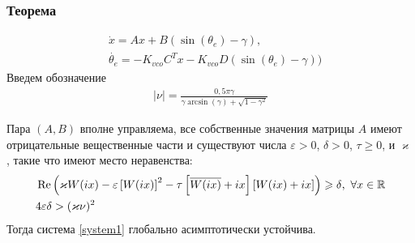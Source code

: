 \documentclass{beamer}
\begin{document}

\begin{frame}
\frametitle{Теорема}
\vspace{-4mm}
 \begin{equation}\label{system1}
 \begin{aligned}
 &\dot{x} = Ax + B(\operatorname{sin}(\theta_e) - \gamma) \text{,}\\
 &\dot{\theta_e} = -K_{vco}C^T x -K_{vco}D(\operatorname{sin}(\theta_e) - \gamma))
 \end{aligned}
\end{equation}
\vspace{-2.5mm}
Введем обозначение
 \begin{equation}
 \begin{aligned}
\mid\nu\mid = \frac{0,5\pi\gamma}{\gamma \operatorname{arcsin} (\gamma) + \sqrt{1-\gamma^2}}
 \end{aligned}
\end{equation}
\vspace{-3mm}
\begin{theorem}
Пара $(A, B)$ вполне управляема, все собственные значения матрицы $A$ имеют отрицательные вещественные части и существуют числа $\varepsilon > 0$, $\delta > 0$, $\tau \geqslant 0$, и $\varkappa$, такие что имеют место неравенства:\vspace{-2.5mm}
 \begin{align*}
&\operatorname{Re}\left( \varkappa W(ix)- \varepsilon\left[W(ix)\right]^2-\tau\left[ \overline{W(ix)}+ix \right]\left[W(ix)+ix \right]\right) \geqslant \delta \text{,}\enskip\forall x \in \mathbb{R}\label{first_th_eq}\\
&4\varepsilon\delta > (\varkappa\nu)^2
\end{align*}
Тогда система \eqref{system1} глобально асимптотически устойчива.
\end{theorem}
\end{frame}

\end{document}
